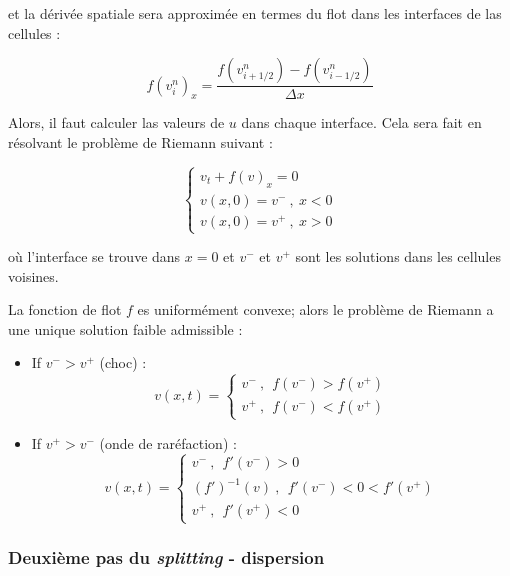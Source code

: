 \noindent et la dérivée spatiale sera approximée en termes du flot dans les interfaces de las cellules :

\begin{equation*}
f(v_i^n)_x = \frac{f\left(v_{i+1/2}^n\right) - f\left(v_{i-1/2}^n\right)}{\Delta x}
\end{equation*}

\indent Alors, il faut calculer las valeurs de $u$ dans chaque interface. Cela sera fait en résolvant le problème de Riemann suivant :

\begin{equation*}
\begin{cases}
v_t + f(v)_x = 0 \\
v(x,0) = v^- \ , \ x < 0 \\
v(x,0) = v^+ \ , \ x > 0
\end{cases}
\end{equation*}

\noindent où l'interface se trouve dans $x=0$ et $v^-$ et $v^+$ sont les solutions dans les cellules voisines.

\indent La fonction de flot $f$ es uniformément convexe; alors le problème de Riemann a une unique solution faible admissible  \cite{conservationLaws2002} :

\begin{itemize}
\item  If $v^- > v^+$  (choc) : 
\begin{equation*}
v(x,t) = 
\begin{cases}
v^- \ ,\ \   f(v^-) > f(v^+) \\
v^+ \ ,\ \ f(v^-) < f(v^+)
\end{cases}
\end{equation*}

\item If $v^+ > v^-$  (onde de raréfaction) :
\begin{equation*}
v(x,t) = 
\begin{cases}
v^- \ ,\ \ f'(v^-) > 0 \\
\left(f'\right)^{-1}(v) \ ,\ \ f'(v^-) < 0 < f'(v^+) \\
v^+ \ ,\ \ f'(v^+) < 0 
\end{cases}
\end{equation*}
\end{itemize}


\subsubsection{Deuxième pas du \emph{splitting} - dispersion}

